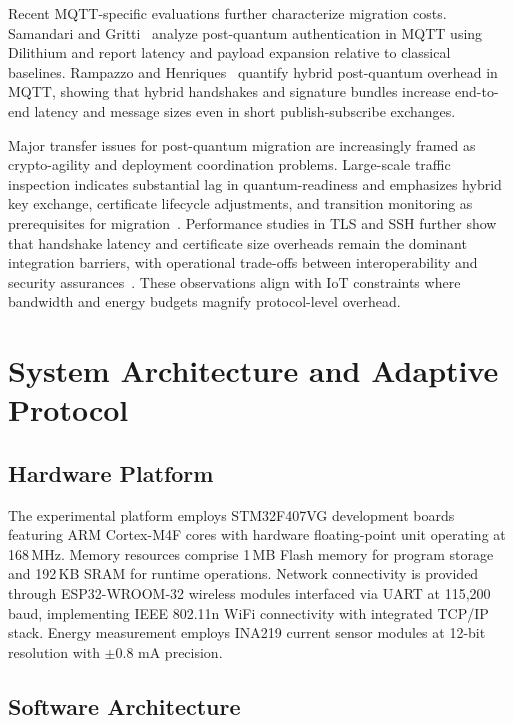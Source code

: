 \documentclass[final, twoside]{IEEEtran} %
\begin{document}
Recent MQTT-specific evaluations further characterize migration costs. Samandari and Gritti~\cite{Samandari2023} analyze post-quantum authentication in MQTT using Dilithium and report latency and payload expansion relative to classical baselines. Rampazzo and Henriques~\cite{Rampazzo2023} quantify hybrid post-quantum overhead in MQTT, showing that hybrid handshakes and signature bundles increase end-to-end latency and message sizes even in short publish-subscribe exchanges.

Major transfer issues for post-quantum migration are increasingly framed as crypto-agility and deployment coordination problems. Large-scale traffic inspection indicates substantial lag in quantum-readiness and emphasizes hybrid key exchange, certificate lifecycle adjustments, and transition monitoring as prerequisites for migration~\cite{Cho2025}. Performance studies in TLS and SSH further show that handshake latency and certificate size overheads remain the dominant integration barriers, with operational trade-offs between interoperability and security assurances~\cite{Kampanakis2020,Sikeridis2020}. These observations align with IoT constraints where bandwidth and energy budgets magnify protocol-level overhead.

\section{System Architecture and Adaptive Protocol}\label{sec:architecture}

\subsection{Hardware Platform}

The experimental platform employs STM32F407VG development boards featuring ARM Cortex-M4F cores with hardware floating-point unit operating at 168\,MHz. Memory resources comprise 1\,MB Flash memory for program storage and 192\,KB SRAM for runtime operations. Network connectivity is provided through ESP32-WROOM-32 wireless modules interfaced via UART at 115,200 baud, implementing IEEE 802.11n WiFi connectivity with integrated TCP/IP stack. Energy measurement employs INA219 current sensor modules at 12-bit resolution with $\pm$0.8 mA precision.

\subsection{Software Architecture}
\end{document}
